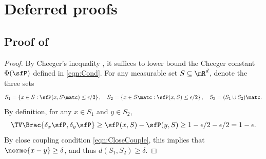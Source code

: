 \documentclass[11pt]{article}
\begin{document}
\section{Deferred proofs}
\label{app:Proofs}

\subsection{Proof of \texorpdfstring{}{Proposition \ref{prop:SpecGap_via_Iso}}}
\label{app:pf_SpecGap_via_Iso}

\begin{proof}
By Cheeger's inequality , it suffices to lower bound the Cheeger constant $\Phi(\sfP)$ defined in \eqref{eqn:Cond}.
%
For any measurable set $S \subseteq \mR^d$, denote the three sets
\[
    S_1 = \left\{ x \in S: \sfP(x,S\matc) \le \epsilon/2 \right\}, \quad S_2 = \left\{ x \in S\matc: \sfP(x,S) \le \epsilon/2 \right\}, \quad S_3 = (S_1\cup S_2)\matc.
\]
By definition, for any $x\in S_1$ and $y \in S_2$,
\[
    \TV \Brac{ \delta_x \sfP , \delta_y \sfP } \ge \sfP(x,S) - \sfP(y,S) \ge 1 - \epsilon/2 - \epsilon/2 = 1 - \epsilon.
\]
By close coupling condition \eqref{eqn:CloseCouple}, this implies that $\norme{x-y} \ge \delta$, and thus $d(S_1,S_2) \ge \delta$. 



\end{proof}
\end{document}
